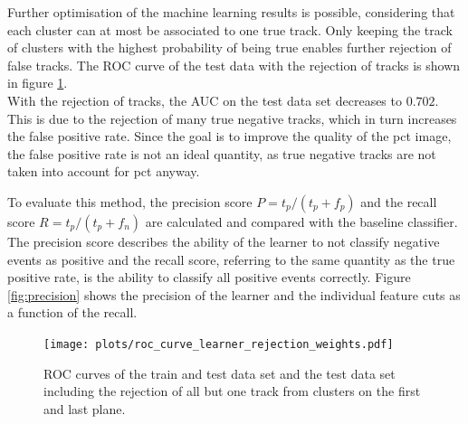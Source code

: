 Further optimisation of the machine learning results is possible, considering that each cluster can at most be associated to one true track.
Only keeping the track of clusters with the highest probability of being true enables further rejection of
false tracks. The ROC curve of the test data with the rejection of tracks is shown in figure \ref{fig:rejection}. \\
With the rejection of tracks, the AUC on the test data set decreases to $0.702$. This is due to the rejection of many true negative tracks, which in turn increases
the false positive rate. Since the goal is to improve the quality of the pct image, the false positive rate is not an ideal quantity, as true negative tracks
are not taken into account for pct anyway.

To evaluate this method, the precision score $P=t_p/(t_p + f_p)$ and the recall score $R=t_p/(t_p + f_n)$ are calculated and compared with the baseline classifier. The precision
score describes the ability of the learner to not classify negative events as positive and the recall score, referring to the same quantity as the true positive rate,
is the ability to classify all positive events correctly.
Figure \ref{fig:precision} shows the precision of the learner and the individual feature cuts as a function of the recall.

\begin{figure}[H]
  \centering
  \texttt{[image: plots/roc\_curve\_learner\_rejection\_weights.pdf]}
  \caption{ROC curves of the train and test data set and the test data set including the rejection of all but one track from clusters on the first and last plane.}
  \label{fig:rejection}
\end{figure}



